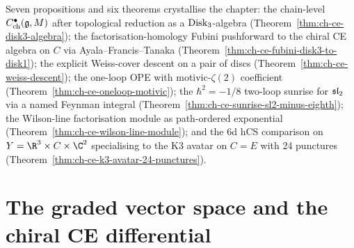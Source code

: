 Seven propositions and six theorems crystallise the chapter:
the chain-level \(C^\bullet_{\mathrm{ch}}(\mathfrak{g},M)\) after topological
reduction as a \(\mathrm{Disk}_3\)-algebra
(Theorem~\ref{thm:ch-ce-disk3-algebra});
the factorisation-homology Fubini pushforward to the chiral CE algebra
on $C$ via Ayala--Francis--Tanaka
(Theorem~\ref{thm:ch-ce-fubini-disk3-to-disk1});
the explicit Weiss-cover descent on a pair of discs
(Theorem~\ref{thm:ch-ce-weiss-descent});
the one-loop OPE with motivic-$\zeta(2)$ coefficient
(Theorem~\ref{thm:ch-ce-oneloop-motivic});
the $\hbar^2 = -1/8$ two-loop sunrise for $\mathfrak{sl}_2$ via a named
Feynman integral
(Theorem~\ref{thm:ch-ce-sunrise-sl2-minus-eighth});
the Wilson-line factorisation module as path-ordered exponential
(Theorem~\ref{thm:ch-ce-wilson-line-module});
and the 6d hCS comparison on $Y=\R^3\times C\times\C^2$ specialising
to the K3 avatar on $C=E$ with 24 punctures
(Theorem~\ref{thm:ch-ce-k3-avatar-24-punctures}).

\section{The graded vector space and the chiral CE differential}
\label{sec:ch-ce-graded-vs-differential}

